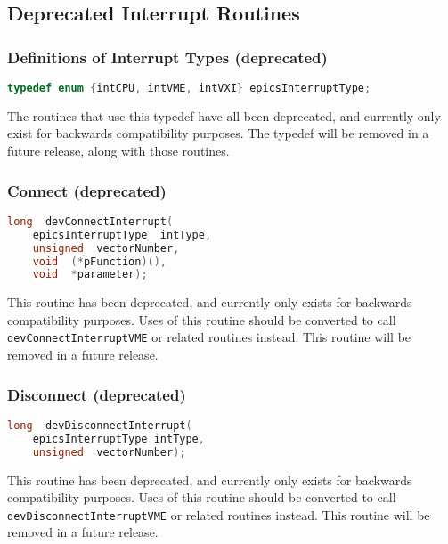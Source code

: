 \subsection{Deprecated Interrupt Routines}

\subsubsection{Definitions of Interrupt Types (deprecated)}

\begin{lstlisting}[language=C]
typedef enum {intCPU, intVME, intVXI} epicsInterruptType;
\end{lstlisting}

The routines that use this typedef have all been deprecated, and currently only exist for backwards compatibility purposes. 
The typedef will be removed in a future release, along with those routines.

\subsubsection{Connect (deprecated)}

\begin{lstlisting}[language=C]
long  devConnectInterrupt(
    epicsInterruptType  intType,
    unsigned  vectorNumber,
    void  (*pFunction)(),
    void  *parameter);
\end{lstlisting}

This routine has been deprecated, and currently only exists for backwards compatibility purposes. Uses of this routine 
should be converted to call \verb|devConnectInterruptVME| or related routines instead. This routine will be removed in a 
future release.

\subsubsection{Disconnect (deprecated)}

\begin{lstlisting}[language=C]
long  devDisconnectInterrupt(
    epicsInterruptType intType,
    unsigned  vectorNumber);
\end{lstlisting}

This routine has been deprecated, and currently only exists for backwards compatibility purposes. Uses of this routine 
should be converted to call \verb|devDisconnectInterruptVME| or related routines instead. This routine will be removed 
in a future release.

